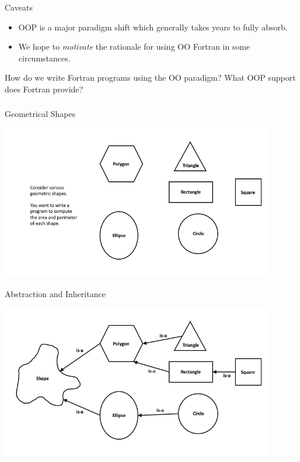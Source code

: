 \documentclass[11pt]{beamer}
\begin{document}

\begin{frame}{Caveats} 

    \begin{itemize}
	\item OOP is a major paradigm shift which generally takes years to fully absorb.
        \item We hope to \emph{motivate} the rationale for using OO Fortran in some circumstances.
    \end{itemize}

How do we write Fortran programs using the OO paradigm?
What OOP support does Fortran provide?

\end{frame} 


\begin{frame}[fragile]
\frametitle{}



\end{frame}


\begin{frame}{Geometrical Shapes} 
\begin{center} 
  \includegraphics[width=0.9\textwidth]{../../shared/shapes0.png} 
\end{center} 

\end{frame} 



\begin{frame}{Abstraction and Inheritance} 

\begin{center} 
  \includegraphics[width=0.9\textwidth]{../../shared/shapes.png} 
\end{center} 

\end{frame} 
\end{document}
